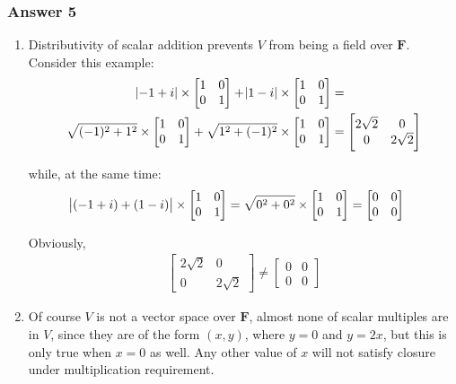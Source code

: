 \documentclass[11pt]{article}
\begin{document}
\subsubsection{Answer 5}
\label{sec-1-3-1}
\begin{enumerate}
\item Distributivity of scalar addition prevents $V$ from being a field over
$\textbf{F}$.  Consider this example:
\begin{align*}
  \abs{-1+i} \times
  \begin{bmatrix}
    1 & 0 \\
    0 & 1
  \end{bmatrix} +
  \abs{1-i} \times
  \begin{bmatrix}
    1 & 0 \\
    0 & 1
  \end{bmatrix} &= \\
  \sqrt{(-1)^2+1^2} \times
  \begin{bmatrix}
    1 & 0 \\
    0 & 1
  \end{bmatrix} +
  \sqrt{1^2+(-1)^2} \times
  \begin{bmatrix}
    1 & 0 \\
    0 & 1
  \end{bmatrix} &=
  \begin{bmatrix}
    2\sqrt{2} & 0 \\
    0 & 2\sqrt{2}
  \end{bmatrix}
\end{align*}

while, at the same time:
\begin{align*}
  \abs{(-1+i) + (1-i)} \times
  \begin{bmatrix}
    1 & 0 \\
    0 & 1
  \end{bmatrix} = 
  \sqrt{0^2+0^2} \times
  \begin{bmatrix}
    1 & 0 \\
    0 & 1
  \end{bmatrix} &=
  \begin{bmatrix}
    0 & 0 \\
    0 & 0
  \end{bmatrix}
\end{align*}

Obviously, 
\begin{align*}
  \begin{bmatrix}
    2\sqrt{2} & 0 \\
    0 & 2\sqrt{2}
  \end{bmatrix} \neq 
  \begin{bmatrix}
    0 & 0 \\
    0 & 0
  \end{bmatrix}
\end{align*}

\item Of course $V$ is not a vector space over $\mathbf{F}$, almost none of
scalar multiples are in $V$, since they are of the form $(x, y)$, where
$y = 0$ and $y = 2x$, but this is only true when $x = 0$ as well.  Any
other value of $x$ will not satisfy closure under multiplication
requirement.
\end{enumerate}
\end{document}
